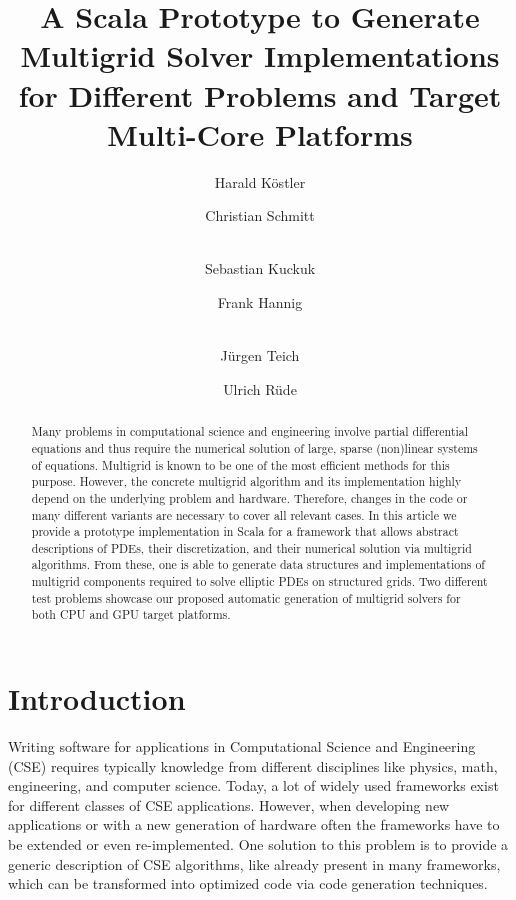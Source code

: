 \documentclass[onecolumn]{svjour3}
\begin{document}
\title{A Scala Prototype to Generate Multigrid Solver Implementations for Different Problems and Target Multi-Core Platforms}

\author{
Harald K\"ostler \and
	Christian Schmitt \and \\
	Sebastian Kuckuk \and
	Frank Hannig \and \\
	J\"urgen Teich \and
	Ulrich R\"ude
}	




\maketitle

\begin{abstract}
Many problems in computational science and engineering involve partial differential equations and thus require the numerical solution of large, sparse (non)linear systems of equations. Multigrid is known to be one of the most efficient methods for this purpose. However, the concrete multigrid algorithm and its implementation highly depend on the underlying problem and hardware. Therefore, changes in the code or many different variants are necessary to cover all relevant cases.     
In this article we provide a prototype implementation in Scala for a framework that allows abstract descriptions of PDEs, their discretization, and their numerical solution via multigrid algorithms. From these, one is able to generate data structures and implementations of multigrid components required to solve elliptic PDEs on structured grids. 
Two different test problems showcase our proposed automatic generation of multigrid solvers for both CPU and GPU target platforms. 
\end{abstract}



\section{Introduction}
\label{sec:introduction}


Writing software for applications in Computational Science and Engineering (CSE) requires typically knowledge from different disciplines like physics, math, engineering, and computer science.
Today, a lot of widely used frameworks exist for different classes of CSE applications. However, when developing new applications or with a new generation of hardware often the frameworks have to be extended or even re-implemented.  
One solution to this problem is to provide a generic description of CSE algorithms, like already present in many frameworks, which can be transformed into optimized code via code generation techniques.
\end{document}
